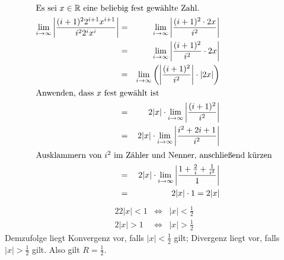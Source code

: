 \documentclass[10pt,a4paper,oneside,ngerman,numbers=noenddot]{scrartcl}
\begin{document}
\subsection{} %
\subsubsection{} %
\begin{alignat*}{2}
\intertext{Es sei $x \in \mathbb{R}$ eine beliebig fest gewählte Zahl.}
\lim\limits_{i \rightarrow \infty} \left|\frac{(i+1)^{2}2^{i+1}x^{i+1}}{i^{2}2^{i}x^{i}} \right| &=& \lim\limits_{i \rightarrow \infty} \left|\frac{(i+1)^{2} \cdot 2x}{i^{2}} \right| \\
&=& \lim\limits_{i \rightarrow \infty} \left|\frac{(i+1)^{2}}{i^{2}} \cdot 2x \right| \\
&=& \lim\limits_{i \rightarrow \infty} \left(\left|\frac{(i+1)^{2}}{i^{2}}\right| \cdot |2x| \right) \\
\intertext{Anwenden, dass $x$ fest gewählt ist}
&=& 2|x| \cdot \lim\limits_{i \rightarrow \infty} \left|\frac{(i+1)^{2}}{i^{2}}\right| \\
&=& 2|x| \cdot \lim\limits_{i \rightarrow \infty} \left|\frac{i^{2} + 2i + 1}{i^{2}}\right| \\
\intertext{Ausklammern von $i^{2}$ im Zähler und Nenner, anschließend kürzen}
&=& 2|x| \cdot \lim\limits_{i \rightarrow \infty} \left|\frac{1 + \frac{2}{i} + \frac{1}{i^{2}}}{1}\right| \\
&=& 2|x| \cdot 1 = 2|x|
\end{alignat*}
\begin{alignat*}{2}
2|x| < 1 &\Longleftrightarrow & |x| < \frac{1}{2} \\
2|x| > 1 &\Longleftrightarrow & |x| > \frac{1}{2}
\end{alignat*}
Demzufolge liegt Konvergenz vor, falls $|x| < \frac{1}{2}$ gilt; Divergenz liegt vor, falls $|x| > \frac{1}{2}$ gilt. Also gilt $R = \frac{1}{2}$.
\end{document}
